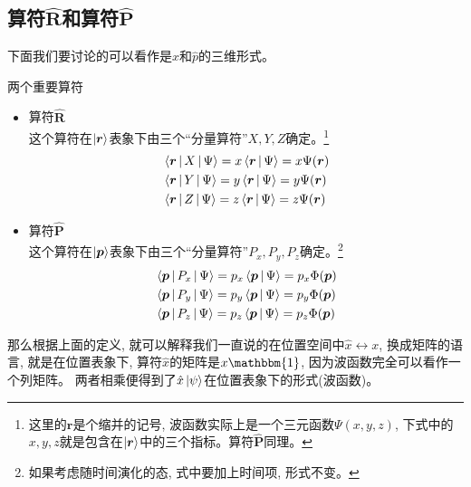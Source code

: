\documentclass[a4paper,zihao=-4,linespread=1]{ctexrep}
\begin{document}
    \subsection*{算符$\hat{\bm{R}}$和算符$\hat{\bm{P}}$}
    下面我们要讨论的可以看作是$\hat x$和$\hat p$的三维形式。
    \begin{define}{两个重要算符}
        \begin{itemize}
            \item 算符$\hat{\bm{R}}$\\
            这个算符在$\ket{\bm{r}}$表象下由三个“分量算符”$X,Y,Z$确定。\footnote{这里的$\bm{r}$是个缩并的记号, 波函数实际上是一个三元函数$\Psi(x,y,z)$, 下式中的$x,y,z$就是包含在$\ket{\bm{r}}$中的三个指标。算符$\hat{\bm{P}}$同理。}
            \begin{align*}
                &\Braket{\bm{r}|X|\Psi}=x \Braket{\bm{r}|\Psi}=x\Psi(\bm{r})\\
                &\Braket{\bm{r}|Y|\Psi}=y \Braket{\bm{r}|\Psi}=y\Psi(\bm{r})\\
                &\Braket{\bm{r}|Z|\Psi}=z \Braket{\bm{r}|\Psi}=z\Psi(\bm{r})
            \end{align*}
            \item 算符$\hat{\bm{P}}$\\
            这个算符在$\ket{\bm{p}}$表象下由三个“分量算符”$P_x,P_y,P_z$确定。\footnote{如果考虑随时间演化的态, 式中要加上时间项, 形式不变。}
            \begin{align*}
                &\Braket{\bm{p}|P_x|\Psi}=p_x \Braket{\bm{p}|\Psi}=p_x\Phi(\bm{p})\\
                &\Braket{\bm{p}|P_y|\Psi}=p_y \Braket{\bm{p}|\Psi}=p_y\Phi(\bm{p})\\
                &\Braket{\bm{p}|P_z|\Psi}=p_z \Braket{\bm{p}|\Psi}=p_z\Phi(\bm{p})
            \end{align*}
        \end{itemize}
    \end{define}
    那么根据上面的定义, 就可以解释我们一直说的在位置空间中$\hat{x}\leftrightarrow x$, 换成矩阵的语言, 就是在位置表象下, 算符$\hat{x}$的矩阵是$x\mathbbm{1}$, 因为波函数完全可以看作一个列矩阵。
    两者相乘便得到了$\hat{x}\ket{\psi}$在位置表象下的形式(波函数)。
\end{document}
